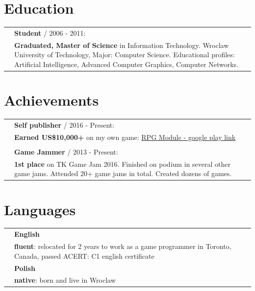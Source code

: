 \documentclass[12pt,a4paper]{article}
\begin{document}
\begin{multicols}{2}
\begin{tabular}{ >{\RaggedLeft}p{0cm}   p{8.5cm}  }
	\end{tabular}

\vfill

\section*{Education }
	\begin{tabular}{ >{\RaggedLeft}p{0cm}  p{8.5cm}   }

		 & \textbf{Student} / 2006 - 2011: \\
		& \hspace{5mm}  \textbf{Graduated, Master of Science} in Information Technology. Wroclaw University of Technology, Major: Computer Science. Educational profiles: Artificial Intelligence, Advanced Computer Graphics, Computer Networks.   \\	 
	\end{tabular}


\section*{Achievements}
	\begin{tabular}  { >{\RaggedLeft}p{0cm}   p{8.5cm} }  
		& \textbf{Self publisher} / 2016 - Present: \\
		& \hspace{5mm} \textbf{Earned US\$10,000+} on my own game: {\href{https://play.google.com/store/apps/details?id=com.wyspianStudios.rpgModuleFull}{RPG Module - google play link}}   \\
		 & \\
		 & \textbf{Game Jammer} / 2013 - Present: \\
		& \hspace{5mm} \textbf{1st place} on TK Game Jam 2016. Finished on podium in several other game jams. Attended 20+ game jams in total. Created dozens of  games.  \\
	\end{tabular} 

\section*{Languages }
\begin{tabular}{ >{\RaggedLeft}p{0cm}  p{8.5cm}   }
	& \textbf{English} \\
	& \hspace{5mm} \textbf{fluent}: relocated for 2 years to work as a game programmer in Toronto, Canada, passed ACERT: C1 english certificate  \\
	&  \textbf{Polish} \\
	& \hspace{5mm} \textbf{native}: born and live in Wroclaw \\	 
\end{tabular}


\end{multicols}
\end{document}
